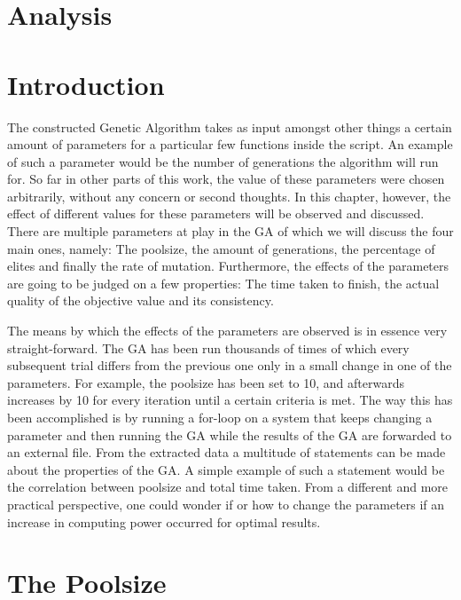 \section{Analysis}
\section{Introduction}

\par
The constructed Genetic Algorithm takes as input amongst other things a certain amount of parameters for a particular few functions inside the script. An example of such a parameter would be the number of generations the algorithm will run for. So far in other parts of this work, the value of these parameters were chosen arbitrarily, without any concern or second thoughts. In this chapter, however, the effect of different values for these parameters will be observed and discussed. 
There are multiple parameters at play in the GA of which we will discuss the four main ones, namely: The poolsize, the amount of generations, the percentage of elites and finally the rate of mutation. Furthermore, the effects of the parameters are going to be judged on a few properties: The time taken to finish, the actual quality of the objective value and its consistency.
\par
\vspace{5mm}

The means by which the effects of the parameters are observed is in essence very straight-forward. The GA has been run thousands of times of which every subsequent trial differs from the previous one only in a small change in one of the parameters.
For example, the poolsize has been set to 10, and afterwards increases by 10 for every iteration until a certain criteria is met. The way this has been accomplished is by running a for-loop on a system that keeps changing a parameter and then running the GA while the results of the GA are forwarded to an external file.
From the extracted data a multitude of statements can be made about the properties of the GA. A simple example of such a statement would be the correlation between poolsize and total time taken. From a different and more practical perspective, one could wonder if or how to change the parameters if an increase in computing power occurred for optimal results.


\section{The Poolsize}

